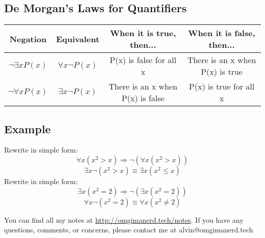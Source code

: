 \documentclass{math}
\begin{document}
\subsection*{De Morgan's Laws for Quantifiers}
\begin{center}
  \begin{tabular}{|c|c|c|c|}
    \hline
    Negation & Equivalent & When it is true, then... &
    When it is false, then... \\ \hline
    \( \neg{\exists{x}P(x)} \) & \( \forall{x}\neg{P(x)} \) &
    P(x) is false for all x & There is an x when P(x) is true \\ \hline
    \( \neg{\forall{x}P(x)} \) & \( \exists{x}\neg{P(x)} \) &
    There is an x when P(x) is false & P(x) is true for all x \\ \hline
  \end{tabular}
\end{center}

\subsection*{Example}
Rewrite in simple form:
\[ \forall{x}(x^{2} > x) \Rightarrow \neg{(\forall{x}(x^{2}>x))} \]
\[ \exists{x}\neg{(x^{2} > x)} \equiv \exists{x}(x^{2} \leq x) \]
Rewrite in simple form:
\[ \exists{x}(x^{2} = 2) \Rightarrow \neg{(\exists{x}(x^{2} = 2))} \]
\[ \forall{x}\neg{(x^{2} = 2)} \equiv \forall{x}(x^{2} \neq 2) \]

\begin{center}
  You can find all my notes at \url{http://omgimanerd.tech/notes}. If you have
  any questions, comments, or concerns, please contact me at
  alvin@omgimanerd.tech
\end{center}
\end{document}
